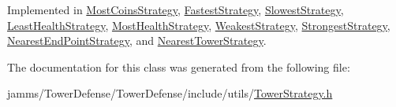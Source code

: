 Implemented in \hyperlink{class_most_coins_strategy_a56c6fb58485c7d356a92c556560365a5}{Most\+Coins\+Strategy}, \hyperlink{class_fastest_strategy_a1c3c8c3e6245218bd8dfe6f8010a86dd}{Fastest\+Strategy}, \hyperlink{class_slowest_strategy_ab99897892826bf0ddccf5d60d6e638ee}{Slowest\+Strategy}, \hyperlink{class_least_health_strategy_ac75ddddd3fd8cd2ea7852bc8d4a587dc}{Least\+Health\+Strategy}, \hyperlink{class_most_health_strategy_ab9d860836441a757691dd21bb2131b85}{Most\+Health\+Strategy}, \hyperlink{class_weakest_strategy_a3e9379c627d43f7d9a949cceb40440bb}{Weakest\+Strategy}, \hyperlink{class_strongest_strategy_aa5553aa32c9ff916e4c3cb50c0bbfab2}{Strongest\+Strategy}, \hyperlink{class_nearest_end_point_strategy_ae68cd9ced5ff42a4740f6d5320200782}{Nearest\+End\+Point\+Strategy}, and \hyperlink{class_nearest_tower_strategy_a22014ea3f55beadd905093f0f4d28f5a}{Nearest\+Tower\+Strategy}.



The documentation for this class was generated from the following file\+:\begin{DoxyCompactItemize}
\item 
jamms/\+Tower\+Defense/\+Tower\+Defense/include/utils/\hyperlink{_tower_strategy_8h}{Tower\+Strategy.\+h}\end{DoxyCompactItemize}
